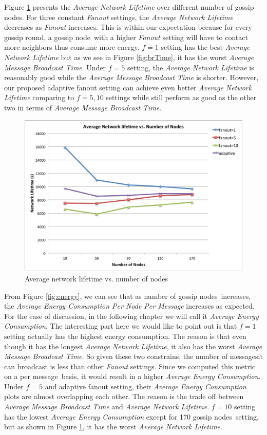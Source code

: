 \documentclass[onehalf,11pt]{beavtex}
\newcommand{\msgs}{messages}
\newcommand{\msg}{message}
\newcommand{\gn}{gossip node}
\newcommand{\gns}{gossip nodes}
\newcommand{\ambt}{Average Message Broadcast Time}
\newcommand{\anl}{Average Network Lifetime}
\newcommand{\aec}{Average Energy Consumption}
\begin{document}
Figure \ref{fig:life} presents the \emph{Average Network Lifetime} over different number of \gns. For three constant \emph{Fanout} settings, the \emph{\anl} decreases as \emph{Fanout} increases. This is within our expectation because for every gossip round, a \gn ~with a higher \emph{Fanout} setting will have to contact more neighbors thus consume more energy. $f=1$ setting has the best \emph{\anl} but as we see in Figure \ref{fig:brTime}, it has the worst \emph{\ambt}. Under $f=5$ setting, the \emph{\anl} is reasonably good while the \emph{\ambt} is shorter. However, our proposed adaptive fanout setting can achieve even better \emph{\anl} comparing to $f=5,10$ settings while still perform as good as the other two in terms of \emph{\ambt}. 

\begin{figure} 
	\centering
	\includegraphics[width=5.5in]{life.png}
	\caption{Average network lifetime vs. number of nodes}
	\label{fig:life}
\end{figure}

From Figure \ref{fig:energy}, we can see that as number of \gns ~increases, the \emph{Average Energy Consumption Per Node Per Message} increases as expected. For the ease of discussion, in the following chapter we will call it \emph{Average Energy Consumption}. The interesting part here we would like to point out is that $f=1$ setting actually has the highest energy consumption. The reason is that even though it has the longest \emph{\anl}, it also has the worst \emph{\ambt}. So given these two constrains, the number of \msgs it can broadcast is less than other \emph{Fanout} settings. Since we computed this metric on a per \msg ~basis, it would result in a higher \emph{\aec}. Under $f=5$ and adaptive fanout setting, their \emph{\aec} plots are almost overlapping each other. The reason is the trade off between \emph{\ambt} and \emph{\anl}. $f=10$ setting has the lowest \emph{\aec} except for 170 \gns ~setting, but as shown in Figure \ref{fig:life}, it has the worst \emph{\anl}. 
\end{document}

